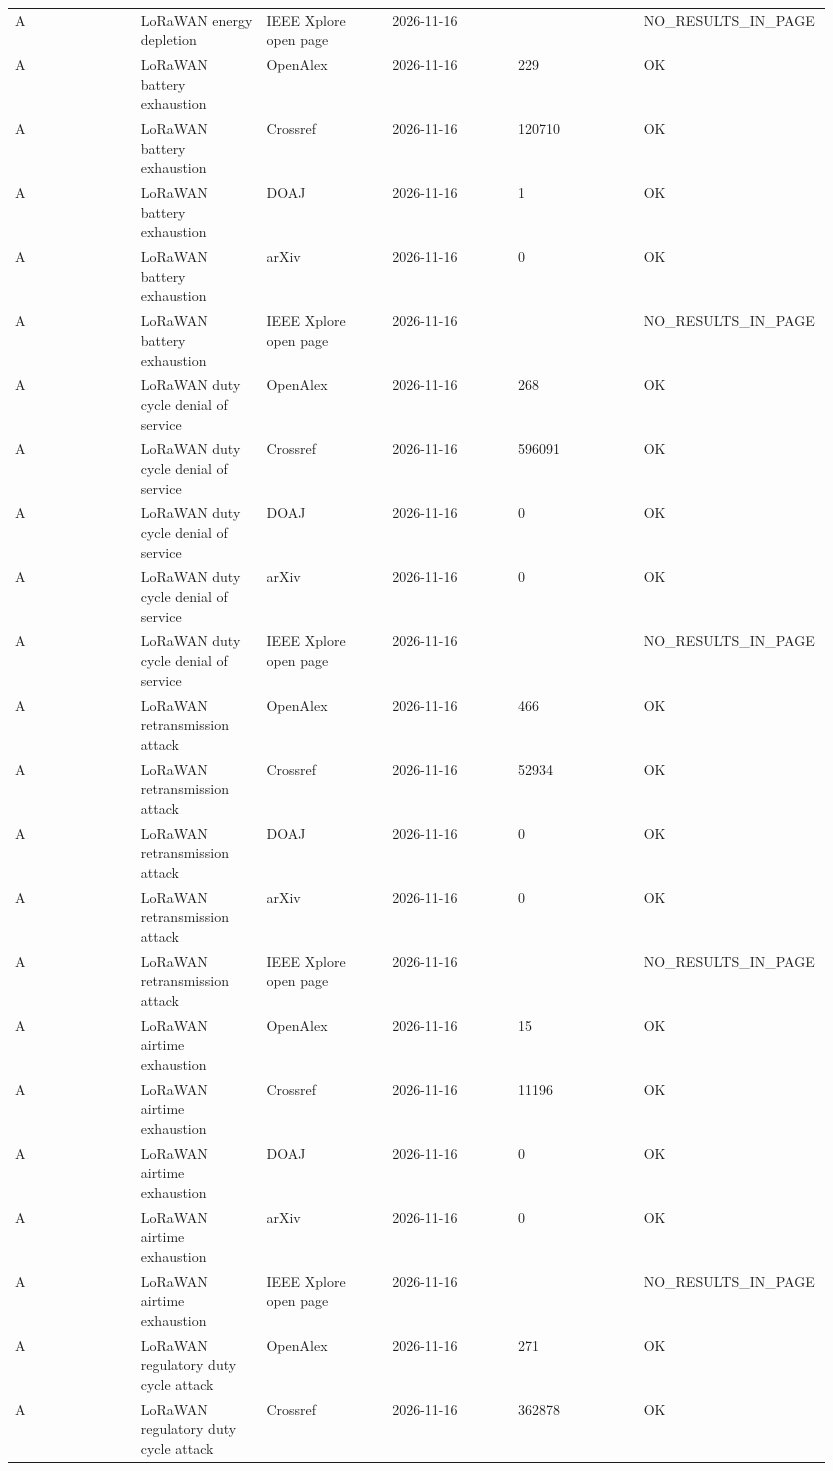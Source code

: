 {\begin{longtable}{p{0.158\linewidth}p{0.158\linewidth}p{0.158\linewidth}p{0.158\linewidth}p{0.158\linewidth}p{0.158\linewidth}}
A & LoRaWAN energy depletion & IEEE Xplore open page & 2026-11-16 &  & NO\_RESULTS\_IN\_PAGE \\
A & LoRaWAN battery exhaustion & OpenAlex & 2026-11-16 & 229 & OK \\
A & LoRaWAN battery exhaustion & Crossref & 2026-11-16 & 120710 & OK \\
A & LoRaWAN battery exhaustion & DOAJ & 2026-11-16 & 1 & OK \\
A & LoRaWAN battery exhaustion & arXiv & 2026-11-16 & 0 & OK \\
A & LoRaWAN battery exhaustion & IEEE Xplore open page & 2026-11-16 &  & NO\_RESULTS\_IN\_PAGE \\
A & LoRaWAN duty cycle denial of service & OpenAlex & 2026-11-16 & 268 & OK \\
A & LoRaWAN duty cycle denial of service & Crossref & 2026-11-16 & 596091 & OK \\
A & LoRaWAN duty cycle denial of service & DOAJ & 2026-11-16 & 0 & OK \\
A & LoRaWAN duty cycle denial of service & arXiv & 2026-11-16 & 0 & OK \\
A & LoRaWAN duty cycle denial of service & IEEE Xplore open page & 2026-11-16 &  & NO\_RESULTS\_IN\_PAGE \\
A & LoRaWAN retransmission attack & OpenAlex & 2026-11-16 & 466 & OK \\
A & LoRaWAN retransmission attack & Crossref & 2026-11-16 & 52934 & OK \\
A & LoRaWAN retransmission attack & DOAJ & 2026-11-16 & 0 & OK \\
A & LoRaWAN retransmission attack & arXiv & 2026-11-16 & 0 & OK \\
A & LoRaWAN retransmission attack & IEEE Xplore open page & 2026-11-16 &  & NO\_RESULTS\_IN\_PAGE \\
A & LoRaWAN airtime exhaustion & OpenAlex & 2026-11-16 & 15 & OK \\
A & LoRaWAN airtime exhaustion & Crossref & 2026-11-16 & 11196 & OK \\
A & LoRaWAN airtime exhaustion & DOAJ & 2026-11-16 & 0 & OK \\
A & LoRaWAN airtime exhaustion & arXiv & 2026-11-16 & 0 & OK \\
A & LoRaWAN airtime exhaustion & IEEE Xplore open page & 2026-11-16 &  & NO\_RESULTS\_IN\_PAGE \\
A & LoRaWAN regulatory duty cycle attack & OpenAlex & 2026-11-16 & 271 & OK \\
A & LoRaWAN regulatory duty cycle attack & Crossref & 2026-11-16 & 362878 & OK \\

\end{longtable}}
